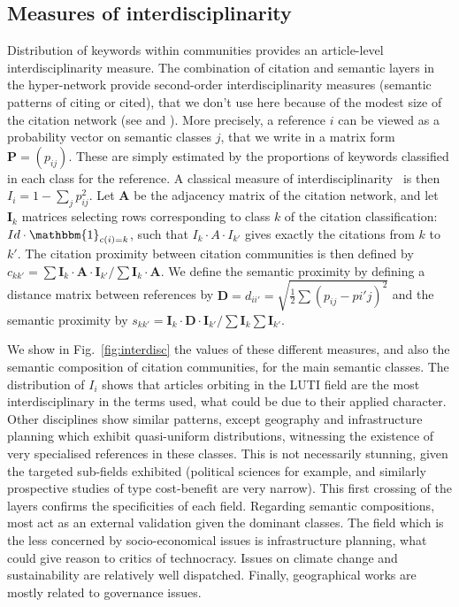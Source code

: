 \documentclass[10pt]{article}
\begin{document}
\subsection{Measures of interdisciplinarity}

Distribution of keywords within communities provides an article-level interdisciplinarity measure. The combination of citation and semantic layers in the hyper-network provide second-order interdisciplinarity measures (semantic patterns of citing or cited), that we don't use here because of the modest size of the citation network (see \cite{raimbault2019exploration} and \cite{bergeaud2017classifying}). More precisely, a reference $i$ can be viewed as a probability vector on semantic classes $j$, that we write in a matrix form $\mathbf{P}=(p_{ij})$. These are simply estimated by the proportions of keywords classified in each class for the reference. A classical measure of interdisciplinarity~\cite{bergeaud2017classifying} is then $I_i = 1 - \sum_j p_{ij}^2$. Let $\mathbf{A}$ be the adjacency matrix of the citation network, and let $\mathbf{I}_k$ matrices selecting rows corresponding to class $k$ of the citation classification: $Id\cdot \mathbbm{1}_{c(i)=k}$, such that $I_k \cdot A \cdot I_{k'}$ gives exactly the citations from $k$ to $k'$. The citation proximity between citation communities is then defined by $c_{kk'} = \sum \mathbf{I}_k \cdot \mathbf{A} \cdot \mathbf{I}_{k'} /  \sum \mathbf{I}_k \cdot \mathbf{A}$. We define the semantic proximity by defining a distance matrix between references by $\mathbf{D} = d_{ii'}=\sqrt{\frac{1}{2}\sum (p_{ij}-p{i'j})^2}$ and the semantic proximity by $s_{kk'} = \mathbf{I}_k \cdot \mathbf{D} \cdot \mathbf{I}_{k'} / \sum \mathbf{I}_k \sum \mathbf{I}_{k'}$.


We show in Fig.~\ref{fig:interdisc} the values of these different measures, and also the semantic composition of citation communities, for the main semantic classes. The distribution of $I_i$ shows that articles orbiting in the LUTI field are the most interdisciplinary in the terms used, what could be due to their applied character. Other disciplines show similar patterns, except geography and infrastructure planning which exhibit quasi-uniform distributions, witnessing the existence of very specialised references in these classes. This is not necessarily stunning, given the targeted sub-fields exhibited (political sciences for example, and similarly prospective studies of type cost-benefit are very narrow). This first crossing of the layers confirms the specificities of each field. Regarding semantic compositions, most act as an external validation given the dominant classes. The field which is the less concerned by socio-economical issues is infrastructure planning, what could give reason to critics of technocracy. Issues on climate change and sustainability are relatively well dispatched. Finally, geographical works are mostly related to governance issues.
\end{document}
